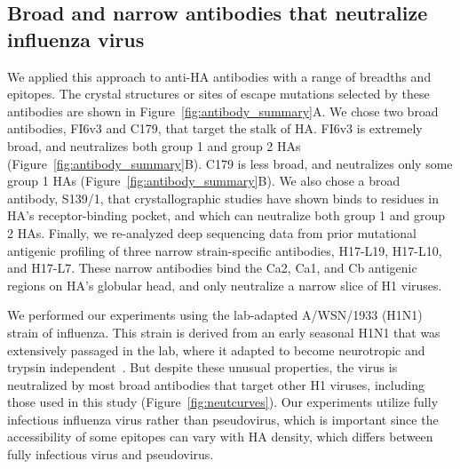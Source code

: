 \documentclass[11pt]{article}
\begin{document}
\subsection*{Broad and narrow antibodies that neutralize influenza virus}
We applied this approach to anti-HA antibodies with a range of breadths and epitopes.
The crystal structures or sites of escape mutations selected by these antibodies are shown in Figure~\ref{fig:antibody_summary}A.
We chose two broad antibodies, FI6v3 and C179, that target the stalk of HA\cite{corti2011neutralizing, okuno1993common, dreyfus2013structure}. 
FI6v3 is extremely broad, and neutralizes both group 1 and group 2 HAs (Figure~\ref{fig:antibody_summary}B).
C179 is less broad, and neutralizes only some group 1 HAs (Figure~\ref{fig:antibody_summary}B).
We also chose a broad antibody, S139/1, that crystallographic studies have shown binds to residues in HA's receptor-binding pocket\cite{lee2012heterosubtypic}, and which can neutralize both group 1 and group 2 HAs\cite{yoshida2009cross, lee2012heterosubtypic}.
Finally, we re-analyzed deep sequencing data from prior mutational antigenic profiling of three narrow strain-specific antibodies, H17-L19, H17-L10, and H17-L7\cite{doud2017complete}.
These narrow antibodies bind the Ca2, Ca1, and Cb antigenic regions on HA's globular head\cite{caton1982antigenic}, and only neutralize a narrow slice of H1 viruses.

We performed our experiments using the lab-adapted A/WSN/1933 (H1N1) strain of influenza.
This strain is derived from an early seasonal H1N1 that was extensively passaged in the lab, where it adapted to become neurotropic and trypsin independent~\cite{sun2010modifications}.
But despite these unusual properties, the virus is neutralized by most broad antibodies that target other H1 viruses, including those used in this study (Figure~\ref{fig:neutcurves}).
Our experiments utilize fully infectious influenza virus rather than pseudovirus, which is important since the accessibility of some epitopes can vary with HA density, which differs between fully infectious virus and pseudovirus\cite{corti2011neutralizing,joyce2016vaccine}.
\end{document}
